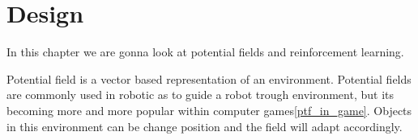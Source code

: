 \chapter{Design}
	In this chapter we are gonna look at potential fields and reinforcement learning.
	
	Potential field is a vector based representation of an environment. Potential fields are commonly used in robotic as to guide a robot trough environment, but its becoming more and more popular within computer games\ref{ptf_in_game}. Objects in this environment can be change position and the field will adapt accordingly. 
	
	
	
	
	